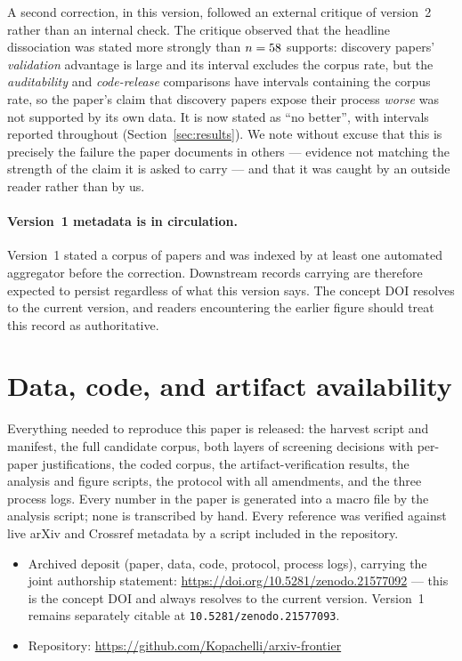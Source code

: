 A second correction, in this version, followed an external critique of version~2 rather than
an internal check. The critique observed that the headline dissociation was stated more
strongly than $n=58{}$ supports: discovery papers' \emph{validation} advantage is
large and its interval excludes the corpus rate, but the \emph{auditability} and
\emph{code-release} comparisons have intervals containing the corpus rate, so the paper's
claim that discovery papers expose their process \emph{worse} was not supported by its own
data. It is now stated as ``no better'', with intervals reported throughout
(Section~\ref{sec:results}). We note without excuse that this is precisely the failure the
paper documents in others --- evidence not matching the strength of the claim it is asked to
carry --- and that it was caught by an outside reader rather than by us.

\paragraph{Version~1 metadata is in circulation.} Version~1 stated a corpus of
\nCorpusVOne{} papers and was indexed by at least one automated aggregator before the
correction. Downstream records carrying \nCorpusVOne{} are therefore expected to persist
regardless of what this version says. The concept DOI resolves to the current version, and
readers encountering the earlier figure should treat this record as authoritative.

\section{Data, code, and artifact availability}
\label{sec:avail}

Everything needed to reproduce this paper is released: the harvest script and manifest, the
full candidate corpus, both layers of screening decisions with per-paper justifications, the
coded corpus, the artifact-verification results, the analysis and figure scripts, the protocol
with all amendments, and the three process logs. Every number in the paper is generated into a
macro file by the analysis script; none is transcribed by hand. Every reference was verified
against live arXiv and Crossref metadata by a script included in the repository.

\begin{itemize}\itemsep1pt
\item Archived deposit (paper, data, code, protocol, process logs), carrying the joint
authorship statement: \url{https://doi.org/10.5281/zenodo.21577092} --- this is the concept
DOI and always resolves to the current version. Version~1 remains separately citable at
\texttt{10.5281/zenodo.21577093}.
\item Repository: \url{https://github.com/Kopachelli/arxiv-frontier}
\end{itemize}

